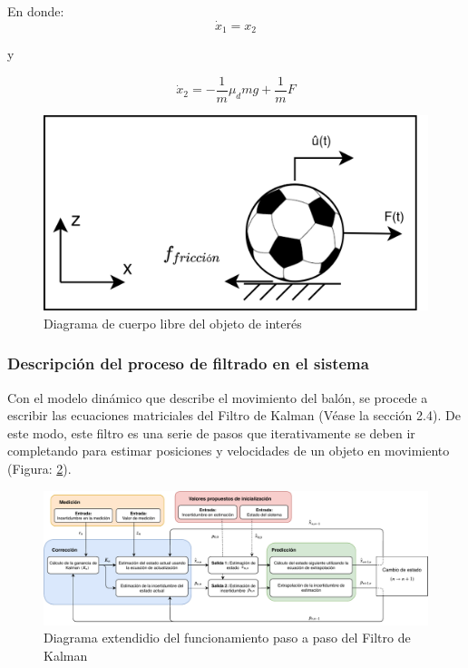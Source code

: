 En donde:
\begin{equation}
\dot{x}_1 = x_2
\label{eq:state_variable_1}
\end{equation}

y 

\begin{equation}
\dot{x}_2 = -\frac{1}{m}\mu_d m g + \frac{1}{m}F
\label{eq:state_variable_2}
\end{equation}


\begin{figure}
\centering
\includegraphics[scale=0.1]{images/dynamic_model.png}
\caption{Diagrama de cuerpo libre del objeto de interés}
\label{fig:dynamic_model}
\end{figure}

		\subsubsection*{Descripción del proceso de filtrado en el sistema}
Con el modelo dinámico que describe el movimiento del balón, se procede a escribir las ecuaciones matriciales del Filtro de Kalman (Véase la sección 2.4). De este modo, este filtro es una serie de pasos que iterativamente se deben ir completando para estimar posiciones y velocidades de un objeto en movimiento (Figura: \ref{fig:kalman_extended_diagram}).

\begin{figure}
\centering
\includegraphics[scale=0.55]{images/kalman_extended_diagram.pdf}
\caption{Diagrama extendidio del funcionamiento paso a paso del Filtro de Kalman}
\label{fig:kalman_extended_diagram}
\end{figure}

